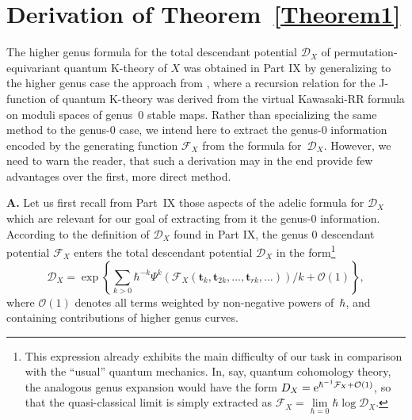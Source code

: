 \documentclass[pdftex]{sigma}
\def\D{\mathcal D}
\def\F{\mathcal F}
\def\O{\mathcal O}
\def\t{{\mathbf t}}
\def\h{\hbar}
\begin{document}
\section{Derivation of Theorem~\ref{Theorem1}}\label{section5}

The higher genus formula for the total descendant potential $\D_X$ of permutation-equivariant quantum K-theory of $X$ was obtained in Part IX
by generalizing to the higher genus case the approach from \cite{GiTo},
where a recursion relation for the J-function of quantum K-theory was derived from the virtual Kawasaki-RR formula on moduli spaces of genus~0 stable maps.
Rather than specializing the same method to the genus-$0$ case, we intend
here to extract the genus-$0$ information encoded by the generating function
$\F_X$ from the formula for~$\D_X$. However, we need to warn the reader, that such a derivation may in the end provide few advantages over the first, more direct method.

{\bf A.} Let us first recall from Part~IX those aspects of the adelic formula for $\D_X$ which are relevant for our goal of extracting from it
the genus-0 information. According to the definition of $\D_X$ found in Part IX, the genus 0 descendant potential $\F_X$ enters the total descendant potential $\D_X$ in the form\footnote{This expression already exhibits the main difficulty of our task in comparison with the ``usual'' quantum mechanics. In, say, quantum cohomology theory, the analogous genus expansion would have the form $D_X={\rm e}^{\h^{-1}\F_X+\O(1)}$, so that the quasi-classical limit is simply extracted as $\F_X=\lim\limits_{\h=0} \h \log \D_X$.}
\[ \D_X = \exp\left\{ \sum_{k>0} \h^{-k}\Psi^k(\F_X(\t_k, \t_{2k},\dots,\t_{rk},\dots))/k +
 \O (1)\right\},\]
where $\O(1)$ denotes all terms weighted by non-negative powers of~$\h$, and
containing contributions of higher genus curves.
\end{document}
